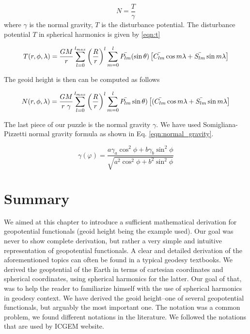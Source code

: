 \begin{equation}
\label{eqn:brums}
N = \frac{T}{\gamma}
\end{equation}
where $\gamma$ is the normal gravity, $T$ is the disturbance potential. The disturbance potential $T$ in spherical harmonics is given by \ref{eqn:t}

\begin{equation}
\label{eqn:t}
T(r, \phi, \lambda) = \frac{GM}{r}\sum_{l=0}^{l_{max}}\left(\frac{R}{r}\right)^{l}\sum_{m=0}^{l}\bar{P_{lm}}(\sin \theta)\left[\bar{C_{lm}} \cos m \lambda \\
+ \bar{S_{lm}} \sin m \lambda\right]
\end{equation}

The geoid height is then can be computed as follows

\begin{equation}
\label{eqn:n}
N(r, \phi, \lambda) = \frac{GM}{r\ \gamma}\sum_{l=0}^{l_{max}}\left(\frac{R}{r}\right)^{l}\sum_{m=0}^{l}\bar{P_{lm}}\sin \theta)\left[(\bar{C_{lm}} \cos m \lambda \\
+ \bar{S_{lm}} \sin m \lambda\right]
\end{equation}

The last piece of our puzzle is the normal gravity $\gamma$. We have used Somigliana-Pizzetti normal gravity formula as shown in Eq. \ref{eqn:normal_gravity}.

\begin{equation}
\label{eqn:normal_gravity}
\gamma(\varphi) = \frac{a \gamma_a \cos^2 \phi + b \gamma_b \sin^2\phi}{\sqrt{a^2 \cos^2 \phi + b^2 \sin^2 \phi}}
\end{equation} 


\section{Summary}

We aimed at this chapter to introduce a sufficient mathematical derivation for geopotential functionals (geoid height being the example used). Our goal was never to show complete derivation, but rather a very simple and intuitive representation of geopotential functionals. A clear and detailed derivation of the aforementioned topics can often be found in a typical geodesy textbooks. We derived the geoptential of the Earth in terms of cartesian coordinates and spherical coordinates, using spherical harmonics for the latter. Our goal of that, was to help the reader to familiarize himself with the use of spherical harmonics in geodesy context. We have derived the geoid height--one of several geopotential functionals, but arguably the most important one. The notation was a common problem, we found different notations in the literature. We followed the notations that are used by ICGEM website.




